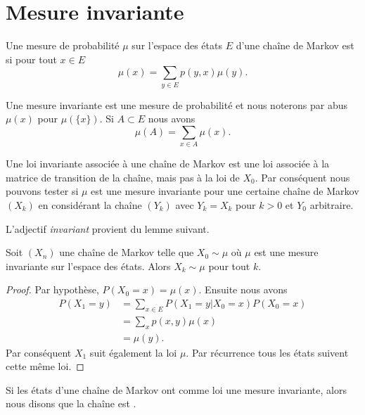 \section{Mesure invariante}

\begin{definition}
    Une mesure de probabilité \( \mu\) sur l'espace des états \( E\) d'une chaîne de Markov est  si pour tout \( x\in E\)
    \begin{equation}
        \mu(x)=\sum_{y\in E}p(y,x)\mu(y).
    \end{equation}
\end{definition}
\begin{remark}
    Une mesure invariante est une mesure de probabilité et nous noterons par abus $ \mu(x)$ pour $\mu(\{x\})$. Si \( A\subset E\) nous avons 
    \begin{equation}
        \mu(A)=\sum_{x\in A}\mu(x).
    \end{equation}
\end{remark}

\begin{remark}  \label{RemwcRRFZ}
    Une loi invariante associée à une chaîne de Markov est une loi associée à la matrice de transition de la chaîne, mais pas à la loi de $X_0$. Par conséquent nous pouvons tester si \( \mu\) est une mesure invariante pour une certaine chaîne de Markov $(X_k)$ en considérant la chaîne $(Y_k)$ avec $Y_k=X_k$ pour $k>0$ et $Y_0$ arbitraire.
\end{remark}

L'adjectif \emph{invariant} provient du lemme suivant.
\begin{lemma}       \label{LemUVMwbM}
    Soit \( (X_n)\) une chaîne de Markov telle que \( X_0\sim\mu\) où \( \mu\) est une mesure invariante sur l'espace des états. Alors \( X_k\sim \mu\) pour tout \( k\).
\end{lemma}

\begin{proof}
    Par hypothèse, \( P(X_0=x)=\mu(x)\). Ensuite nous avons
    \begin{subequations}
        \begin{align}
            P(X_1=y)&=\sum_{x\in E}P(X_1=y|X_0=x)P(X_0=x)\\
            &=\sum_xp(x,y)\mu(x)\\
            &=\mu(y).
        \end{align}
    \end{subequations}
    Par conséquent \( X_1\) suit également la loi \( \mu\). Par récurrence tous les états suivent cette même loi.
\end{proof}
Si les états d'une chaîne de Markov ont comme loi une mesure invariante, alors nous disons que la chaîne est .

